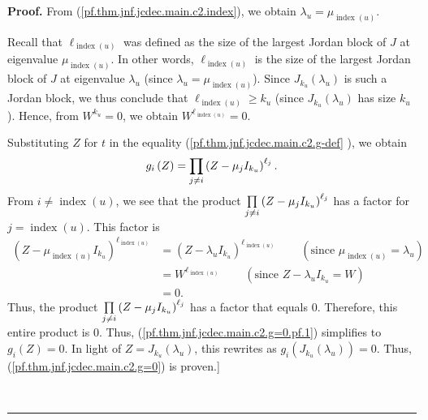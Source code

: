 \documentclass[numbers=enddot,12pt,final,onecolumn,notitlepage]{scrartcl}%
\numberwithin{exer}{subsection}
\theoremstyle{definition}
\newenvironment{proof}[1][Proof]{\noindent\textbf{#1.} }{\ \rule{0.5em}{0.5em}}
\let\prodnonlimits\prod
\renewcommand{\prod}{\prodnonlimits\limits}
\newenvironment{noncompile}{}{}
\begin{document}
\begin{proof}
\begin{noncompile}
From (\ref{pf.thm.jnf.jcdec.main.c2.index}), we obtain $\lambda_{u}%
=\mu_{\operatorname*{index}\left(  u\right)  }$.

Recall that $\ell_{\operatorname*{index}\left(  u\right)  }$ was defined as
the size of the largest Jordan block of $J$ at eigenvalue $\mu
_{\operatorname*{index}\left(  u\right)  }$. In other words, $\ell
_{\operatorname*{index}\left(  u\right)  }$ is the size of the largest Jordan
block of $J$ at eigenvalue $\lambda_{u}$ (since $\lambda_{u}=\mu
_{\operatorname*{index}\left(  u\right)  }$). Since $J_{k_{u}}\left(
\lambda_{u}\right)  $ is such a Jordan block, we thus conclude that
$\ell_{\operatorname*{index}\left(  u\right)  }\geq k_{u}$ (since $J_{k_{u}%
}\left(  \lambda_{u}\right)  $ has size $k_{u}$). Hence, from $W^{k_{u}}=0$,
we obtain $W^{\ell_{\operatorname*{index}\left(  u\right)  }}=0$.

Substituting $Z$ for $t$ in the equality (\ref{pf.thm.jnf.jcdec.main.c2.g-def}%
), we obtain%
\begin{equation}
g_{i}\left(  Z\right)  =\prod\limits_{j\neq i}\left(  Z-\mu_{j}I_{k_{u}%
}\right)  ^{\ell_{j}}. \label{pf.thm.jnf.jcdec.main.c2.g=0.pf.1}%
\end{equation}
From $i\neq\operatorname*{index}\left(  u\right)  $, we see that the product
$\prod\limits_{j\neq i}\left(  Z-\mu_{j}I_{k_{u}}\right)  ^{\ell_{j}}$ has a
factor for $j=\operatorname*{index}\left(  u\right)  $. This factor is
\begin{align*}
\left(  Z-\mu_{\operatorname*{index}\left(  u\right)  }I_{k_{u}}\right)
^{\ell_{\operatorname*{index}\left(  u\right)  }}  &  =\left(  Z-\lambda
_{u}I_{k_{u}}\right)  ^{\ell_{\operatorname*{index}\left(  u\right)  }%
}\ \ \ \ \ \ \ \ \ \ \left(  \text{since }\mu_{\operatorname*{index}\left(
u\right)  }=\lambda_{u}\right) \\
&  =W^{\ell_{\operatorname*{index}\left(  u\right)  }}%
\ \ \ \ \ \ \ \ \ \ \left(  \text{since }Z-\lambda_{u}I_{k_{u}}=W\right) \\
&  =0.
\end{align*}
Thus, the product $\prod\limits_{j\neq i}\left(  Z-\mu_{j}I_{k_{u}}\right)
^{\ell_{j}}$ has a factor that equals $0$. Therefore, this entire product is
$0$. Thus, (\ref{pf.thm.jnf.jcdec.main.c2.g=0.pf.1}) simplifies to
$g_{i}\left(  Z\right)  =0$. In light of $Z=J_{k_{u}}\left(  \lambda
_{u}\right)  $, this rewrites as $g_{i}\left(  J_{k_{u}}\left(  \lambda
_{u}\right)  \right)  =0$. Thus, (\ref{pf.thm.jnf.jcdec.main.c2.g=0}) is
proven.] \medskip


\end{noncompile}
\end{proof}
\end{document}
